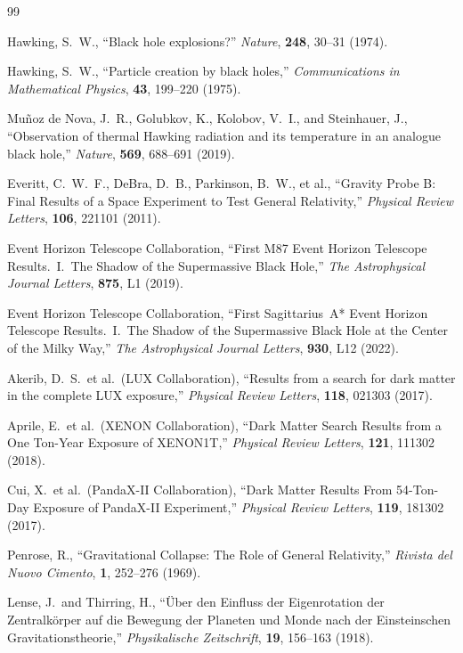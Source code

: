 ﻿\documentclass[12pt,letterpaper]{article}
\begin{document}
\begin{thebibliography}{99}

Hawking, S.~W.,
``Black hole explosions?''
\textit{Nature}, \textbf{248}, 30--31 (1974).


Hawking, S.~W.,
``Particle creation by black holes,''
\textit{Communications in Mathematical Physics}, \textbf{43}, 199--220 (1975).


Mu\~{n}oz de Nova, J.~R., Golubkov, K., Kolobov, V.~I., and Steinhauer, J.,
``Observation of thermal Hawking radiation and its temperature in an analogue black hole,''
\textit{Nature}, \textbf{569}, 688--691 (2019).


Everitt, C.~W.~F., DeBra, D.~B., Parkinson, B.~W., et al.,
``Gravity Probe B: Final Results of a Space Experiment to Test General Relativity,''
\textit{Physical Review Letters}, \textbf{106}, 221101 (2011).


Event Horizon Telescope Collaboration,
``First M87 Event Horizon Telescope Results.\ I.\ The Shadow of the Supermassive Black Hole,''
\textit{The Astrophysical Journal Letters}, \textbf{875}, L1 (2019).


Event Horizon Telescope Collaboration,
``First Sagittarius~A* Event Horizon Telescope Results.\ I.\ The Shadow of the Supermassive Black Hole at the Center of the Milky Way,''
\textit{The Astrophysical Journal Letters}, \textbf{930}, L12 (2022).


Akerib, D.~S.\ et al.\ (LUX Collaboration),
``Results from a search for dark matter in the complete LUX exposure,''
\textit{Physical Review Letters}, \textbf{118}, 021303 (2017).


Aprile, E.\ et al.\ (XENON Collaboration),
``Dark Matter Search Results from a One Ton-Year Exposure of XENON1T,''
\textit{Physical Review Letters}, \textbf{121}, 111302 (2018).


Cui, X.\ et al.\ (PandaX-II Collaboration),
``Dark Matter Results From 54-Ton-Day Exposure of PandaX-II Experiment,''
\textit{Physical Review Letters}, \textbf{119}, 181302 (2017).


Penrose, R.,
``Gravitational Collapse: The Role of General Relativity,''
\textit{Rivista del Nuovo Cimento}, \textbf{1}, 252--276 (1969).


Lense, J.\ and Thirring, H.,
``\"{U}ber den Einfluss der Eigenrotation der Zentralk\"{o}rper auf die Bewegung der Planeten und Monde nach der Einsteinschen Gravitationstheorie,''
\textit{Physikalische Zeitschrift}, \textbf{19}, 156--163 (1918).



\end{thebibliography}
\end{document}
